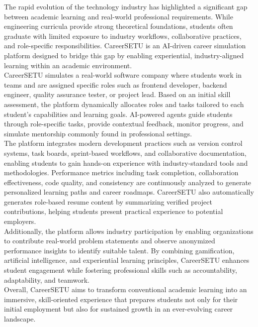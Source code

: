 \documentclass[12pt,a4paper]{report}
\begin{document}
The rapid evolution of the technology industry has highlighted a significant gap between
academic learning and real-world professional requirements. While engineering curricula
provide strong theoretical foundations, students often graduate with limited exposure to
industry workflows, collaborative practices, and role-specific responsibilities. CareerSETU
is an AI-driven career simulation platform designed to bridge this gap by enabling
experiential, industry-aligned learning within an academic environment.\\[0.1cm]

CareerSETU simulates a real-world software company where students work in teams and are
assigned specific roles such as frontend developer, backend engineer, quality assurance
tester, or project lead. Based on an initial skill assessment, the platform dynamically
allocates roles and tasks tailored to each student’s capabilities and learning goals.
AI-powered agents guide students through role-specific tasks, provide contextual feedback,
monitor progress, and simulate mentorship commonly found in professional settings.\\[0.1cm]

The platform integrates modern development practices such as version control systems,
task boards, sprint-based workflows, and collaborative documentation, enabling students
to gain hands-on experience with industry-standard tools and methodologies. Performance
metrics including task completion, collaboration effectiveness, code quality, and
consistency are continuously analyzed to generate personalized learning paths and career
roadmaps. CareerSETU also automatically generates role-based resume content by summarizing
verified project contributions, helping students present practical experience to potential
employers.\\[0.1cm]

Additionally, the platform allows industry participation by enabling organizations to
contribute real-world problem statements and observe anonymized performance insights to
identify suitable talent. By combining gamification, artificial intelligence, and
experiential learning principles, CareerSETU enhances student engagement while fostering
professional skills such as accountability, adaptability, and teamwork.\\[0.1cm]

Overall, CareerSETU aims to transform conventional academic learning into an immersive,
skill-oriented experience that prepares students not only for their initial employment
but also for sustained growth in an ever-evolving career landscape.\\[0.1cm]
\end{document}
